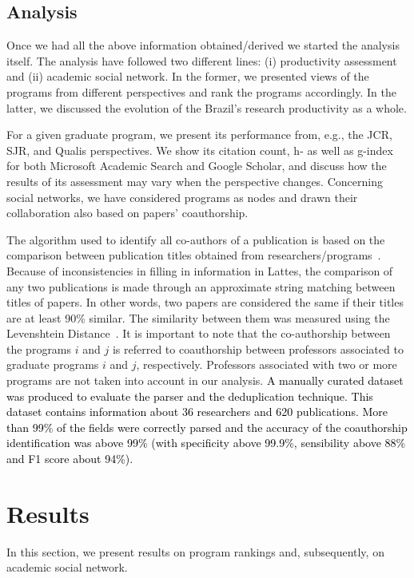 \documentclass[10pt]{article}
\newcommand{\luciano}[1]{\textcolor{black}{#1}}
\begin{document}
\subsection*{Analysis}
\label{sec:analysis}

Once we had all the above information obtained/derived we started the analysis itself. The analysis have followed two
different lines: (i) productivity assessment and (ii) academic social network.  In the former, we presented views of
the programs from different perspectives and rank the programs accordingly. In the latter, we discussed the
evolution of the Brazil's research productivity as a whole.

For a given graduate program, we present its performance from, e.g., the JCR, SJR, and Qualis perspectives. We show its
citation count, h- as well as g-index for both Microsoft Academic Search and Google Scholar, and discuss how the results
of its assessment may vary when the perspective changes. Concerning social networks, we have considered programs as
nodes and drawn their collaboration also based on papers' coauthorship. 

The algorithm used to identify all co-authors of a publication is based on the comparison between publication titles obtained
from researchers/programs~\cite{mena-chalco2009}. Because of inconsistencies in filling in information in Lattes, the
comparison of any two publications is made through an approximate string matching between titles of papers.  In other words,
two papers are considered the same if their titles are at least 90\% similar. The similarity between them was measured using
the Levenshtein Distance~\cite{navarro2001string}. It is important to note that the co-authorship between the programs $i$
and $j$ is referred to coauthorship between professors associated to graduate programs $i$ and $j$, respectively. Professors
associated with two or more programs are not taken into account in our analysis. \luciano{A manually curated dataset was produced to evaluate the parser and the deduplication technique. This dataset contains information about 36 researchers and 620 publications. More than 99\% of the fields were correctly parsed and the accuracy of the coauthorship identification was above 99\% (with specificity above 99.9\%, sensibility above 88\% and F1 score about 94\%).}



\newcommand{\boy}{\textordmasculine}
\section*{Results}\label{sec:result}
In this section, we present results on program rankings and, subsequently, on
academic social network.
\end{document}
